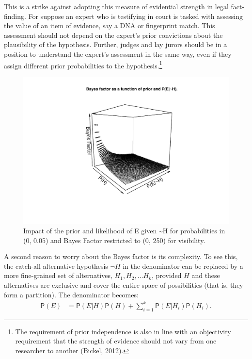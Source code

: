 \documentclass[
  letterpaper,
  DIV=11,
  numbers=noendperiod]{scrartcl}
\newcommand{\pr}[1]{\mathsf{P}(#1)}
\begin{document}
This is a strike against adopting this measure of evidential strength in
legal fact-finding. For suppose an expert who is testifying in court is
tasked with assessing the value of an item of evidence, say a DNA or
fingerprint match. This assessment should not depend on the expert's
prior convictions about the plausibility of the hypothesis. Further,
judges and lay jurors should be in a position to understand the expert's
assessment in the same way, even if they assign different prior
probabilities to the hypothesis.\footnote{The requirement of prior
  independence is also in line with an objectivity requirement that the
  strength of evidence should not vary from one researcher to another
  (Bickel, 2012).}

\footnotesize

\normalsize

\begin{figure}

{\centering \includegraphics[width=1\textwidth,height=\textheight]{Quart_lr-chapter6_files/figure-pdf/fig-bayesfactorprior-1.pdf}

}

\caption{\label{fig-bayesfactorprior}Impact of the prior and likelihood
of E given \textasciitilde H for probabilities in (0, 0.05) and Bayes
Factor restricted to (0, 250) for visibility.}

\end{figure}

A second reason to worry about the Bayes factor is its complexity. To
see this, the catch-all alternative hypothesis \(\neg H\) in the
denominator can be replaced by a more fine-grained set of alternatives,
\(H_1, H_2, \dots H_k\), provided \(H\) and these alternatives are
exclusive and cover the entire space of possibilities (that is, they
form a partition). The denominator becomes:
\begin{align} \label{eq:lotpLong}
\pr{E} & = \pr{E\vert H}\pr{H} +\sum_{i=1}^k \pr{E\vert H_i}\pr{H_i}. 
\end{align}
\end{document}
